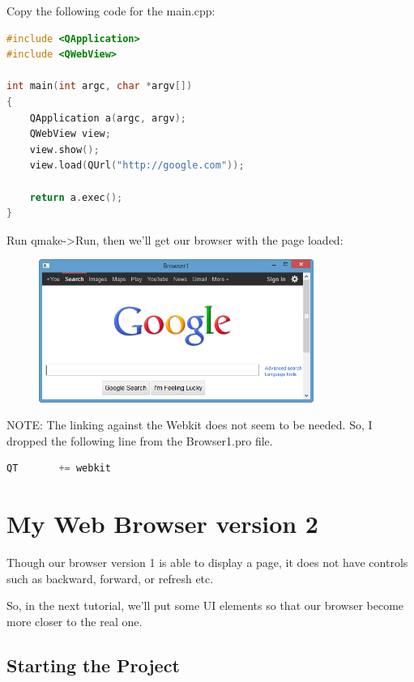 Copy the following code for the main.cpp:

\begin{lstlisting}[language=c++, numbers=none]
#include <QApplication>
#include <QWebView>

int main(int argc, char *argv[])
{
    QApplication a(argc, argv);
    QWebView view;
    view.show();
    view.load(QUrl("http://google.com"));

    return a.exec();
}
\end{lstlisting}

Run qmake-\textgreater{}Run, then we'll get our browser with the page
loaded:

\begin{figure}[htbp]
\centering
\includegraphics[width=0.8\textwidth]{../manuscript/images/Browser1_Run}
\caption{}
\end{figure}

NOTE: The linking against the Webkit does not seem to be needed. So, I
dropped the following line from the Browser1.pro file.

\begin{lstlisting}[language=c++, numbers=none]
QT       += webkit
\end{lstlisting}

\section{My Web Browser version 2}\label{my-web-browser-version-2}

Though our browser version 1 is able to display a page, it does not have
controls such as backward, forward, or refresh etc.

So, in the next tutorial, we'll put some UI elements so that our browser
become more closer to the real one.

\subsection{Starting the Project}\label{starting-the-project}

